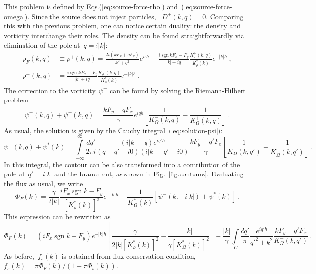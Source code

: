 \documentclass[preprint,aps,eqsecnum]{revtex4-1}
\newcommand{\fplus}[1]{{#1}^{+}}
\newcommand{\fminus}[1]{{#1}^{-}}
\newcommand{\sgn}{\mathop{\mathrm{sgn}}\nolimits}
\begin{document}
This problem is defined by Eqs.(\ref{eq:source-force-rho})
and~(\ref{eq:source-force-omega}). Since the source does not inject particles,
~$\fplus{D}(k, q) = 0$. Comparing this with the previous problem,
one can notice certain duality: the density and vorticity interchange their
roles. The density can be found straightforwardly via elimination of the pole
at~$q = i|k|$:
\begin{align}
  \rho_F(k, q) &\equiv \fplus{\rho}(k, q) = \frac{2i(k F_x + q F_y)}{k^2 + q^2}
  e^{iqh} - \frac{i\sgn k F_x - F_y}{|k| + i q}
   \frac{\fplus{K}_\rho(k, q)}{K_\rho^\ast(k)} e^{-|k|h}
  \ ,
  \\
  \fminus{\rho}(k, q) &= \frac{i\sgn k F_x - F_y}{|k| + iq}
   \frac{\fminus{K}_\rho(k, q)}{K_\rho^\ast(k)} e^{-|k|h}
  \ .
\end{align}
The correction to the vorticity~$\fminus{\psi}$ can be found
 by solving the Riemann-Hilbert problem
\begin{equation}
  \fplus{\psi}(k, q) + \fminus{\psi}(k, q) =
  \frac{k F_y - qF_x}{\gamma} e^{iqh} \left[\frac{1}{\fminus{K}_\Omega(k, q)}
   - \frac{1}{\fplus{K}_\Omega(k, q)} \right]
  \ .
\end{equation}
 As usual, the solution is given
by the Cauchy integral~(\ref{eq:solution-psi}):
\begin{equation}
  \fminus{\psi}(k, q) + \psi^\ast(k) =  \int\limits_{-\infty}^{\infty}
  \frac{dq'}{2\pi i}
  \frac{(i|k| - q) e^{iq'h}}{(q - q' - i0)(i|k| - q' - i0)}
  \frac{k F_y - q'F_x}{\gamma}
  \left[\frac{1}{\fminus{K}_\Omega(k, q')}
            - \frac{1}{\fplus{K}_\Omega(k, q')}\right]
  \ .
\end{equation}
In this integral, the contour can be also transformed into a contribution of
the pole at~$q' = i |k|$ and the branch cut, as shown in Fig.~\ref{fig:contours}.
Evaluating the flux as usual, we write
\begin{equation}
  \Phi_F(k) = \frac{\gamma}{2|k|}\frac{i F_x \sgn k - F_y}{\left[K_\rho^\ast(k)\right]^2}
  e^{-|k| h} - \frac{1}{K_\Omega^\ast(k)} \left[\fminus{\psi}(k, -i|k|) + \psi^\ast(k)\right]
  \ .
\end{equation}
This expression can be rewritten as
\begin{equation}
  \Phi_F(k) =  (i F_x \sgn k - F_y)e^{-|k|h}
  \left[\frac{\gamma}{2|k|\left[K_\rho^\ast(k)\right]^2} - \frac{|k|}{\gamma\left[K_\Omega^\ast(k)\right]^2 }\right]
  -  \frac{|k|}{\gamma}\int\limits_C \frac{dq'}{\pi} \frac{e^{iq'h}}{q'^2 + k^2}
     \frac{k F_y - q'F_x}{\fminus{K}_\Omega(k, q')}
     \ .
\end{equation}
As before,~$f_s(k)$ is obtained from flux conservation condition,
$f_s(k) = \pi \Phi_F(k)/(1 - \pi \Phi_s(k))$.
\end{document}
